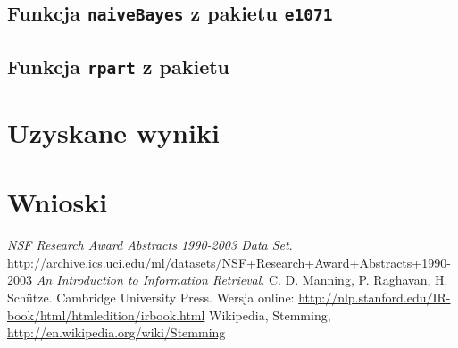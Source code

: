 \documentclass[a4paper,12pt]{article}
\begin{document}
	\subsection{Funkcja \texttt{naiveBayes} z pakietu \texttt{e1071}}
	
	\subsection{Funkcja \texttt{rpart} z pakietu }

\section{Uzyskane wyniki}

\section{Wnioski}


\begin{thebibliography}{9}

   \emph{NSF Research Award Abstracts 1990-2003 Data Set}.
   \url{http://archive.ics.uci.edu/ml/datasets/NSF+Research+Award+Abstracts+1990-2003}
	\emph{An Introduction to Information Retrieval}. 
	C. D. Manning, P. Raghavan, H. Sch\"utze.
	Cambridge University Press.
	Wersja online: \url{http://nlp.stanford.edu/IR-book/html/htmledition/irbook.html}
	Wikipedia, Stemming, \url{http://en.wikipedia.org/wiki/Stemming}

\end{thebibliography}
\end{document}
